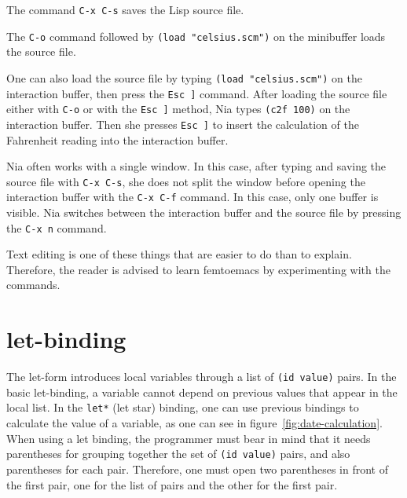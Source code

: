\documentclass[a4paper,12pt]{book}
\begin{document}
The command \verb|C-x C-s| saves the Lisp source 
file. 

The \verb|C-o| command followed
by \verb|(load "celsius.scm")| on the minibuffer
loads the  source file.

One can also load the source file
by typing \verb|(load "celsius.scm")|
on the interaction buffer, 
then press the \verb|Esc ]| command.
After loading the source file either
with \verb|C-o| or with the \verb|Esc ]| method,
Nia types \verb|(c2f 100)| on the interaction
buffer. Then she presses \verb|Esc ]| to
insert the calculation of the Fahrenheit reading
into the interaction buffer.

Nia often works with a single window. 
In this case, after typing and saving
the source file with \verb|C-x C-s|,
she does not split the window
before opening the interaction buffer with the
\verb|C-x C-f| command. In this case,
only one buffer is visible. Nia switches 
between the interaction buffer and
the source file by pressing the  \verb|C-x n|
command. 

Text editing is one of these things that
are easier to do than to explain. Therefore,
the reader is advised to learn femtoemacs
by experimenting with the commands.

\section{let-binding}
The let-form introduces 
local variables
through a list of \verb|(id value)| 
pairs.
In the basic let-binding, a variable cannot 
depend on previous values that appear
in the local list. In the
\verb|let*| (let star) binding,
one can use previous bindings to calculate
the value of a variable, as one can see in
figure~\ref{fig:date-calculation}.
When using a let binding, the programmer must
bear in mind that it needs parentheses for
grouping together the set of \verb|(id value)| pairs,
and also parentheses for each pair. Therefore,
one must open two parentheses in front of the
first pair, one for the list of pairs and the
other for the first pair.
\end{document}
